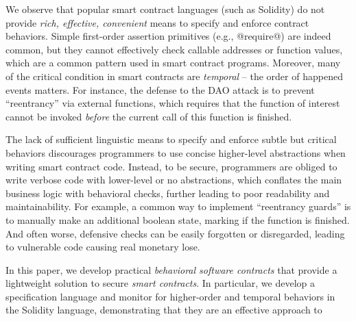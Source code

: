 

We observe that popular smart contract languages (such as Solidity) do
not provide \emph{rich, effective, convenient} means to specify and enforce
contract behaviors.
Simple first-order assertion primitives (e.g., @require@) are indeed common,
but they cannot effectively check callable addresses or function values, which
are a common pattern used in smart contract programs.
Moreover, many of the critical condition in smart contracts are \emph{temporal} --
the order of happened events matters.
For instance, the defense to the DAO attack  is to
prevent ``reentrancy'' via external functions, which requires that the function
of interest cannot be invoked \emph{before} the current call of this function is finished.

The lack of sufficient linguistic means to specify and enforce subtle but
critical behaviors discourages programmers to use concise higher-level
abstractions when writing smart contract code.
Instead, to be secure, programmers are obliged to write verbose code with
lower-level or no abstractions, which conflates the main business logic with
behavioral checks, further leading to poor readability and maintainability.
For example, a common way to implement ``reentrancy guards'' is to manually
make an additional boolean state, marking if the function is finished.
And often worse, defensive checks can be easily forgotten or disregarded,
leading to vulnerable code causing real monetary lose.

In this paper, we develop practical \emph{behavioral
software contracts} that provide a lightweight solution to secure
\emph{smart contracts}.
In particular, we develop a specification language and monitor for higher-order
and temporal behaviors in the Solidity language, demonstrating that they
are an effective approach to


